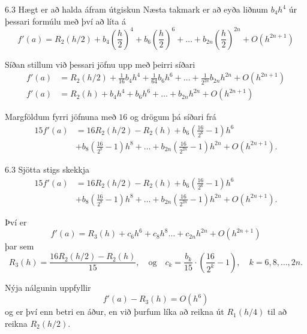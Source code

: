\begin{frame}{6.3 Hægt er að halda áfram útgiskun} 
Næsta takmark er að eyða liðnum $b_4h^4$ úr þessari formúlu með því að
líta á 
\begin{equation*}
  f'(a) = R_2(h/2) + b_4 \left(\frac{h}{2}\right)^4 
  + b_6 \left(\frac{h}{2}\right)^6 + \ldots
  + b_{2n} \left(\frac{h}{2}\right)^{2n} + O(h^{2n+1})
\end{equation*}

\pause
Síðan stillum við þessari jöfnu upp með þeirri síðari
\begin{align*}
  f'(a) &= R_2(h/2) + \tfrac 1{16}b_4 h^4 
  + \tfrac 1{64}b_6 h^6 + \ldots
  + \tfrac 1{2^{2n}}b_{2n} h^{2n} + O(h^{2n+1})\\
  f'(a) &= R_2(h) + b_4 h^4 + b_6 h^6 + \ldots + b_{2n} h^{2n}
  + O(h^{2n+1})
\end{align*}

\pause
Margföldum fyrri jöfnuna með $16$ og drögum þá síðari frá 
\begin{align*}
  15f'(a) &= 16 R_2(h/2) - R_2(h) 
  + b_6 \left( \frac{16}{2^6} - 1 \right) h^6 \\
  &+ b_8 \left( \frac{16}{2^8} - 1 \right) h^8
  + \ldots
  + b_{2n} \left( \frac{16}{2^{2n}} - 1 \right) h^{2n}
  + O(h^{2n+1}).
\end{align*}
\end{frame}


\begin{frame}{6.3 Sjötta stigs skekkja} 
\begin{align*}
  15f'(a) &= 16 R_2(h/2) - R_2(h) 
  + b_6 \left( \frac{16}{2^6} - 1 \right) h^6 \\
  &+ b_8 \left( \frac{16}{2^8} - 1 \right) h^8
  + \ldots
  + b_{2n} \left( \frac{16}{2^{2n}} - 1 \right) h^{2n}
  + O(h^{2n+1}).
\end{align*}

\pause
Því er
\begin{equation*}
  f'(a) = R_3(h) + c_6 h^6 + c_8 h^8 \ldots + c_{2n} h^{2n}
  + O(h^{2n+1})
\end{equation*}
þar sem
\begin{equation*}
  R_3(h) = \frac{16 R_2(h/2) - R_2(h)}{15},
  \quad \text{og} \quad
  c_k = \frac{b_k}{15} \cdot \left( \frac{16}{2^k} - 1 \right),
  \quad k = 6,8,\ldots,2n.
\end{equation*}

\pause
Nýja nálgunin uppfyllir
\begin{equation*}
  f'(a) - R_3(h) = O(h^6)
\end{equation*}
og er því enn betri en áður, en við þurfum líka að reikna út
$R_1(h/4)$ til að reikna $R_2(h/2)$. 
\end{frame}


